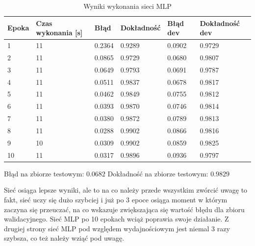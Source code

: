\documentclass{article}
\begin{document}
\begin{table}[!htb]
  \centering
    
  \bgroup
  \def\arraystretch{1.3}
\begin{tabular}{|l|l|l|l|l|l|}
\hline
Epoka & Czas wykonania [s] & Błąd & Dokładność & Błąd dev & Dokładność dev \\ \hline
1 & 11 & 0.2364 & 0.9289 & 0.0902 & 0.9729 \\ \hline
2 & 11 & 0.0865 & 0.9729 & 0.0680 & 0.9807 \\ \hline
3 & 11 & 0.0649 & 0.9793 & 0.0691 & 0.9787 \\ \hline
4 & 11 & 0.0511 & 0.9837 & 0.0678 & 0.9817 \\ \hline
5 & 11 & 0.0462 & 0.9849 & 0.0755 & 0.9812 \\ \hline
6 & 11 & 0.0393 & 0.9870 & 0.0746 & 0.9814 \\ \hline
7 & 11 & 0.0380 & 0.9872 & 0.0789 & 0.9813 \\ \hline
8 & 11 & 0.0288 & 0.9902 & 0.0866 & 0.9816 \\ \hline
9 & 10 & 0.0309 & 0.9902 & 0.0859 & 0.9825 \\ \hline
10 & 11 & 0.0317 & 0.9896 & 0.0936 & 0.9797 \\ \hline
\end{tabular}
  \egroup
  \vspace{10pt}
  \caption{Wyniki wykonania sieci MLP}
\end{table}

Błąd na zbiorze testowym: $0.0682$ \newline
Dokładność na zbiorze testowym: $0.9829$

Sieć osiąga lepsze wyniki, ale to na co należy przede wszystkim zwórcić uwagę to fakt, sieć uczy się dużo szybciej i już po 3 epoce osiąga
moment w którym zaczyna się przeuczać, na co wskazuje zwiększająca się wartość błędu dla zbioru walidacyjnego. Sieć MLP po 10 epokach wciąż poprawia swoje działanie.
Z drugiej strony sieć MLP pod względem wydajnościowym jest niemal 3 razy szybsza, co też należy wziąć pod uwagę.
\end{document}
